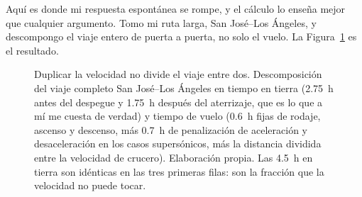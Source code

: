 \documentclass[11pt,letterpaper]{article}
\newcommand{\barrapp}[7]{%
  \node[left, text width=3.1cm, align=right, font=\scriptsize]
       at (-0.12,#1) {#5};%
  \fill[cTierra!45] (0,#1-0.26) rectangle ({#2*1.02},#1+0.26);%
  \fill[#6] ({#2*1.02},#1-0.26) rectangle ({(#2+#3)*1.02},#1+0.26);%
  \fill[cTierra!45] ({(#2+#3)*1.02},#1-0.26)
                    rectangle ({(#2+#3+#4)*1.02},#1+0.26);%
  \node[font=\scriptsize\bfseries, text=white]
       at ({(#2+#3/2)*1.02},#1) {\num{#3} h};%
  \node[right, font=\scriptsize] at ({(#2+#3+#4)*1.02+0.14},#1)
       {\textbf{#7 h}};%
}
\begin{document}
Aquí es donde mi respuesta espontánea se rompe, y el cálculo lo enseña mejor que
cualquier argumento. Tomo mi ruta larga, San José--Los Ángeles, y descompongo el
viaje entero de puerta a puerta, no solo el vuelo. La Figura~\ref{fig:puerta}
es el resultado.

\begin{figure}[t]
\centering
{}
\caption{Duplicar la velocidad no divide el viaje entre dos. Descomposición del
viaje completo San José--Los Ángeles en tiempo en tierra
(\SI{2.75}{\hour} antes del despegue y \SI{1.75}{\hour} después del
aterrizaje, que es lo que a mí me cuesta de verdad) y tiempo de vuelo
(\SI{0.6}{\hour} fijas de rodaje, ascenso y descenso, más
\SI{0.7}{\hour} de penalización de aceleración y desaceleración en los casos
supersónicos, más la distancia dividida entre la velocidad de crucero).
Elaboración propia. Las \SI{4.5}{\hour} en tierra son idénticas en las tres
primeras filas: son la fracción que la velocidad no puede tocar.}
\label{fig:puerta}
\end{figure}
\end{document}
